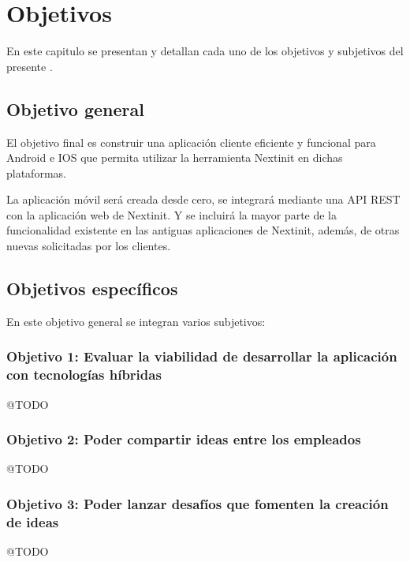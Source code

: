 \chapter{Objetivos}
\label{chap:objetivos}

En este capitulo se  presentan y detallan cada uno de los objetivos y subjetivos
del presente .

\section{Objetivo general}

El objetivo final es construir una aplicación cliente eficiente y funcional para Android e IOS
que permita utilizar la herramienta Nextinit en dichas plataformas.

La aplicación móvil será creada desde cero, se integrará mediante una API REST con la aplicación 
web de Nextinit. Y se incluirá la mayor parte de la funcionalidad existente en las antiguas 
aplicaciones de Nextinit, además, de otras nuevas solicitadas por los clientes.


\section{Objetivos específicos}

En este objetivo general se integran varios subjetivos:

\subsection{Objetivo 1: Evaluar la viabilidad de desarrollar la aplicación con tecnologías híbridas}

@TODO

\subsection{Objetivo 2: Poder compartir ideas entre los empleados}

@TODO

\subsection{Objetivo 3: Poder lanzar desafíos que fomenten la creación de ideas}
@TODO


